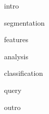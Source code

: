 


{intro}

{segmentation}

{features}


{analysis}

{classification}

{query}

{outro}


%
%









